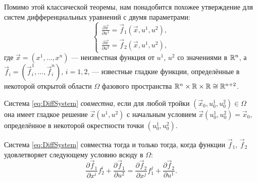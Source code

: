 Помимо этой классической теоремы, нам понадобится похожее утверждение для систем дифференциальных уравнений с двумя параметрами: 
\begin{equation} \label{eq:DiffSystem}
	\begin{cases}
		\frac{\partial\vec{x}}{\partial u^1} = \vec{f}_1(\vec{x}, u^1, u^2),\\
		\frac{\partial\vec{x}}{\partial u^2} = \vec{f}_2(\vec{x}, u^1, u^2),
	\end{cases}
\end{equation}
где $\vec{x} = (x^1, \ldots, x^n)$ --- неизвестная функция от $u^1$, $u^2$ со значениями в $\mathbb{R}^n$, а $\vec{f}_i = (\vec{f}_i^1, \ldots, \vec{f}_i^n)$, $i = 1, 2$, --- известные гладкие функции, определённые в некоторой открытой области $\Omega$ фазового пространства $\mathbb{R}^n \times \mathbb{R} \times \mathbb{R} \cong \mathbb{R}^{n + 2}$.

\begin{definition}
	Система \eqref{eq:DiffSystem} \textit{совместна}, если для любой тройки $(\vec{x}_0, u^1_0, u^2_0) \in \Omega$ она имеет гладкое решение $\vec{x}(u^1, u^2)$ с начальным условием $\vec{x}(u^1_0, u^2_0) = \vec{x}_0$, определённое в некоторой окрестности точки $(u^1_0, u^2_0)$.
\end{definition}

\begin{theorem}[Дарбу] \label{theorem:Darboux}
	Система \eqref{eq:DiffSystem} совместна тогда и только тогда, когда функции $\vec{f}_1$, $\vec{f}_2$ удовлетворяет следующему условию всюду в $\Omega$:
	\begin{equation} \label{eq:Darboux}
		\frac{\partial \vec{f}_1}{\partial x^i}f^i_2 + \frac{\partial\vec{f}_1}{\partial u^2} = \frac{\partial\vec{f}_2}{\partial x^j}f^j_1 + \frac{\partial\vec{f}_2}{\partial u^1}.
	\end{equation}
\end{theorem}

